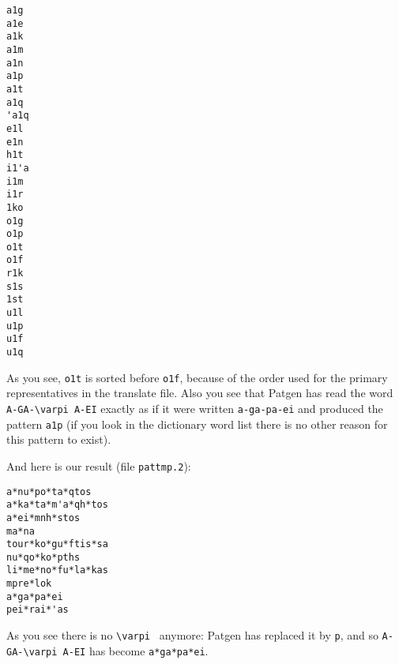 \documentclass{article}
\begin{document}
\begin{verbatim}
a1g
a1e
a1k
a1m
a1n
a1p
a1t
a1q
'a1q
e1l
e1n
h1t
i1'a
i1m
i1r
1ko
o1g
o1p
o1t
o1f
r1k
s1s
1st
u1l
u1p
u1f
u1q
\end{verbatim}

As you see, {\tt o1t} is sorted before {\tt o1f}, because of the order used for the primary representatives in the translate file. Also you see that Patgen
has read the word \verb*=A-GA-\varpi A-EI= exactly as if it
were written \verb*=a-ga-pa-ei= and produced the pattern
{\tt a1p} (if you look in the dictionary word list there is no other
reason for this pattern to exist).

And here is our result (file {\tt pattmp.2}):
\begin{verbatim}
a*nu*po*ta*qtos
a*ka*ta*m'a*qh*tos
a*ei*mnh*stos
ma*na
tour*ko*gu*ftis*sa
nu*qo*ko*pths
li*me*no*fu*la*kas
mpre*lok
a*ga*pa*ei
pei*rai*'as
\end{verbatim}

As you see there is no \verb*=\varpi = anymore:
Patgen has replaced it by \verb=p=, and so
\verb*=A-GA-\varpi A-EI= has become \verb=a*ga*pa*ei=.

%
\end{document}
